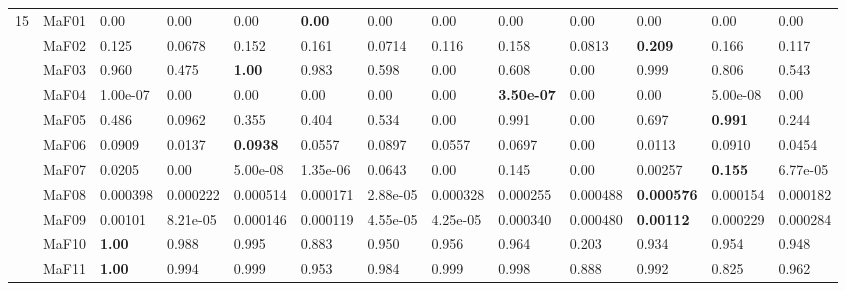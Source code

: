 \documentclass[]{article}
\begin{document}
\begin{landscape}
\begin{table}
\begin{footnotesize}
\begin{tabular}{|l|l|l|l|l|l|l|l|l|l|l|l|l|}
\multirow{15}{*}{15} & MaF01 & \cellcolor{gray95} 0.00 & \cellcolor{gray95} 0.00 & \cellcolor{gray95} 0.00 & \cellcolor{gray95} {\bf 0.00} & \cellcolor{gray95} 0.00 & \cellcolor{gray95} 0.00 & \cellcolor{gray95} 0.00 & \cellcolor{gray95} 0.00 & \cellcolor{gray95} 0.00 & \cellcolor{gray95} 0.00 & \cellcolor{gray95} 0.00\\
 & MaF02 & 0.125 & 0.0678 & 0.152 & \cellcolor{gray95} 0.161 & 0.0714 & 0.116 & \cellcolor{gray95} 0.158 & 0.0813 & \cellcolor{gray95} {\bf 0.209} & \cellcolor{gray95} 0.166 & 0.117\\
 & MaF03 & 0.960 & 0.475 & \cellcolor{gray95} {\bf 1.00} & \cellcolor{gray95} 0.983 & 0.598 & 0.00 & 0.608 & 0.00 & \cellcolor{gray95} 0.999 & 0.806 & 0.543\\
 & MaF04 & \cellcolor{gray95} 1.00e-07 & \cellcolor{gray95} 0.00 & \cellcolor{gray95} 0.00 & \cellcolor{gray95} 0.00 & \cellcolor{gray95} 0.00 & \cellcolor{gray95} 0.00 & \cellcolor{gray95} {\bf 3.50e-07} & \cellcolor{gray95} 0.00 & \cellcolor{gray95} 0.00 & \cellcolor{gray95} 5.00e-08 & \cellcolor{gray95} 0.00\\
 & MaF05 & 0.486 & 0.0962 & 0.355 & 0.404 & \cellcolor{gray95} 0.534 & 0.00 & \cellcolor{gray95} 0.991 & 0.00 & \cellcolor{gray95} 0.697 & \cellcolor{gray95} {\bf 0.991} & 0.244\\
 & MaF06 & \cellcolor{gray95} 0.0909 & 0.0137 & \cellcolor{gray95} {\bf 0.0938} & 0.0557 & \cellcolor{gray95} 0.0897 & 0.0557 & 0.0697 & 0.00 & 0.0113 & \cellcolor{gray95} 0.0910 & 0.0454\\
 & MaF07 & \cellcolor{gray95} 0.0205 & 0.00 & 5.00e-08 & 1.35e-06 & \cellcolor{gray95} 0.0643 & 0.00 & \cellcolor{gray95} 0.145 & 0.00 & 0.00257 & \cellcolor{gray95} {\bf 0.155} & 6.77e-05\\
 & MaF08 & 0.000398 & 0.000222 & \cellcolor{gray95} 0.000514 & 0.000171 & 2.88e-05 & 0.000328 & 0.000255 & \cellcolor{gray95} 0.000488 & \cellcolor{gray95} {\bf 0.000576} & 0.000154 & 0.000182\\
 & MaF09 & \cellcolor{gray95} 0.00101 & 8.21e-05 & 0.000146 & 0.000119 & 4.55e-05 & 4.25e-05 & 0.000340 & \cellcolor{gray95} 0.000480 & \cellcolor{gray95} {\bf 0.00112} & 0.000229 & 0.000284\\
 & MaF10 & \cellcolor{gray95} {\bf 1.00} & \cellcolor{gray95} 0.988 & \cellcolor{gray95} 0.995 & 0.883 & 0.950 & 0.956 & 0.964 & 0.203 & 0.934 & 0.954 & 0.948\\
 & MaF11 & \cellcolor{gray95} {\bf 1.00} & 0.994 & \cellcolor{gray95} 0.999 & 0.953 & 0.984 & \cellcolor{gray95} 0.999 & \cellcolor{gray95} 0.998 & 0.888 & 0.992 & 0.825 & 0.962\\

\end{tabular}
\end{footnotesize}
\end{table}
\end{landscape}
\end{document}
